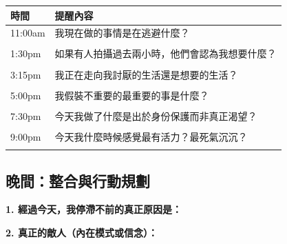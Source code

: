 \documentclass[12pt,a4paper]{article}
\begin{document}
\begin{longtable}{p{3cm}p{11cm}}
\toprule
\textbf{時間} & \textbf{提醒內容} \\
\midrule
\endfirsthead

\bottomrule
\endfoot

11:00am & 我現在做的事情是在逃避什麼？\\
& \fbox{\parbox{9cm}{\vspace{1.5cm}}} \\
\midrule
1:30pm & 如果有人拍攝過去兩小時，他們會認為我想要什麼？\\
& \fbox{\parbox{9cm}{\vspace{1.5cm}}} \\
\midrule
3:15pm & 我正在走向我討厭的生活還是想要的生活？\\
& \fbox{\parbox{9cm}{\vspace{1.5cm}}} \\
\midrule
5:00pm & 我假裝不重要的最重要的事是什麼？\\
& \fbox{\parbox{9cm}{\vspace{1.5cm}}} \\
\midrule
7:30pm & 今天我做了什麼是出於身份保護而非真正渴望？\\
& \fbox{\parbox{9cm}{\vspace{1.5cm}}} \\
\midrule
9:00pm & 今天我什麼時候感覺最有活力？最死氣沉沉？\\
& \fbox{\parbox{9cm}{\vspace{1.5cm}}} \\
\bottomrule
\end{longtable}

\subsection{晚間：整合與行動規劃}

\textbf{1. 經過今天，我停滯不前的真正原因是：}
\begin{center}
\end{center}

\textbf{2. 真正的敵人（內在模式或信念）：}
\begin{center}
\end{center}
\end{document}
